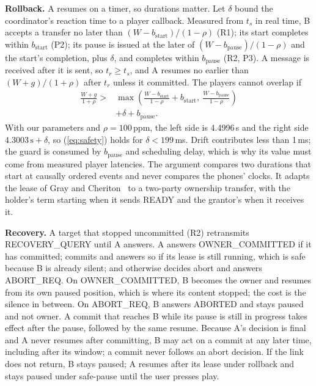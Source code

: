 \documentclass[conference]{IEEEtran}
\begin{document}
\textbf{Rollback.} A resumes on a timer, so durations matter. Let $\delta$ bound the coordinator's reaction time to a player callback. Measured from $t_s$ in real time, B accepts a transfer no later than $(W-b_{\mathrm{start}})/(1-\rho)$ (R1); its start completes within $b_{\mathrm{start}}$ (P2); its pause is issued at the later of $(W-b_{\mathrm{pause}})/(1-\rho)$ and the start's completion, plus $\delta$, and completes within $b_{\mathrm{pause}}$ (R2, P3). A message is received after it is sent, so $t_r \ge t_s$, and A resumes no earlier than $(W+g)/(1+\rho)$ after $t_r$ unless it committed. The players cannot overlap if
\begin{equation}
\begin{split}
\frac{W+g}{1+\rho} > {} & \max\!\left(\frac{W-b_{\mathrm{start}}}{1-\rho} + b_{\mathrm{start}},\ \frac{W-b_{\mathrm{pause}}}{1-\rho}\right) \\
 & + \delta + b_{\mathrm{pause}}.
\end{split}
\label{eq:safety}
\end{equation}
With our parameters and $\rho = 100$\,ppm, the left side is 4.4996\,s and the right side $4.3003\,\mathrm{s} + \delta$, so (\ref{eq:safety}) holds for $\delta < 199$\,ms. Drift contributes less than 1\,ms; the guard is consumed by $b_{\mathrm{pause}}$ and scheduling delay, which is why its value must come from measured player latencies. The argument compares two durations that start at causally ordered events and never compares the phones' clocks. It adapts the lease of Gray and Cheriton~\cite{gray1989} to a two-party ownership transfer, with the holder's term starting when it sends READY and the grantor's when it receives it.

\textbf{Recovery.} A target that stopped uncommitted (R2) retransmits RECOVERY\_QUERY until A answers. A answers OWNER\_COMMITTED if it has committed; commits and answers so if its lease is still running, which is safe because B is already silent; and otherwise decides abort and answers ABORT\_REQ. On OWNER\_COMMITTED, B becomes the owner and resumes from its own paused position, which is where its content stopped; the cost is the silence in between. On ABORT\_REQ, B answers ABORTED and stays paused and not owner. A commit that reaches B while its pause is still in progress takes effect after the pause, followed by the same resume. Because A's decision is final and A never resumes after committing, B may act on a commit at any later time, including after its window; a commit never follows an abort decision. If the link does not return, B stays paused; A resumes after its lease under rollback and stays paused under safe-pause until the user presses play.
\end{document}
